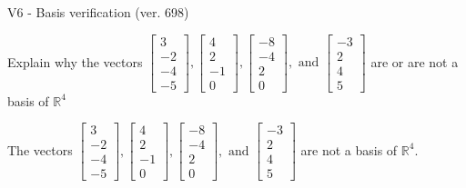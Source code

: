 \begin{exercise}
  \begin{exerciseTitle}V6 - Basis verification (ver. 698)\end{exerciseTitle}
  \begin{exerciseStatement}
    Explain why the vectors \(\left[\begin{array}{r}
3 \\
-2 \\
-4 \\
-5
\end{array}\right] , \left[\begin{array}{r}
4 \\
2 \\
-1 \\
0
\end{array}\right] , \left[\begin{array}{r}
-8 \\
-4 \\
2 \\
0
\end{array}\right] , \text{ and } \left[\begin{array}{r}
-3 \\
2 \\
4 \\
5
\end{array}\right]\) are or are not a basis of \(\mathbb{R}^4\)	


  \end{exerciseStatement}
  \begin{exerciseAnswer}
   The vectors \(\left[\begin{array}{r}
3 \\
-2 \\
-4 \\
-5
\end{array}\right] , \left[\begin{array}{r}
4 \\
2 \\
-1 \\
0
\end{array}\right] , \left[\begin{array}{r}
-8 \\
-4 \\
2 \\
0
\end{array}\right] , \text{ and } \left[\begin{array}{r}
-3 \\
2 \\
4 \\
5
\end{array}\right]\) 
  	 are not  a basis of \(\mathbb{R}^4\).
  


  \end{exerciseAnswer}
\end{exercise}
